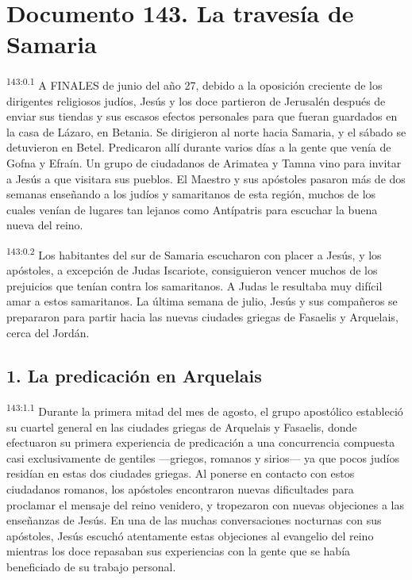 \chapter{Documento 143. La travesía de Samaria}
\par 
\textsuperscript{143:0.1} A FINALES de junio del año 27, debido a la oposición creciente de los dirigentes religiosos judíos, Jesús y los doce partieron de Jerusalén después de enviar sus tiendas y sus escasos efectos personales para que fueran guardados en la casa de Lázaro, en Betania. Se dirigieron al norte hacia Samaria, y el sábado se detuvieron en Betel. Predicaron allí durante varios días a la gente que venía de Gofna y Efraín. Un grupo de ciudadanos de Arimatea y Tamna vino para invitar a Jesús a que visitara sus pueblos. El Maestro y sus apóstoles pasaron más de dos semanas enseñando a los judíos y samaritanos de esta región, muchos de los cuales venían de lugares tan lejanos como Antípatris para escuchar la buena nueva del reino.

\par 
\textsuperscript{143:0.2} Los habitantes del sur de Samaria escucharon con placer a Jesús, y los apóstoles, a excepción de Judas Iscariote, consiguieron vencer muchos de los prejuicios que tenían contra los samaritanos. A Judas le resultaba muy difícil amar a estos samaritanos. La última semana de julio, Jesús y sus compañeros se prepararon para partir hacia las nuevas ciudades griegas de Fasaelis y Arquelais, cerca del Jordán.

\section*{1. La predicación en Arquelais}
\par 
\textsuperscript{143:1.1} Durante la primera mitad del mes de agosto, el grupo apostólico estableció su cuartel general en las ciudades griegas de Arquelais y Fasaelis, donde efectuaron su primera experiencia de predicación a una concurrencia compuesta casi exclusivamente de gentiles ---griegos, romanos y sirios--- ya que pocos judíos residían en estas dos ciudades griegas. Al ponerse en contacto con estos ciudadanos romanos, los apóstoles encontraron nuevas dificultades para proclamar el mensaje del reino venidero, y tropezaron con nuevas objeciones a las enseñanzas de Jesús. En una de las muchas conversaciones nocturnas con sus apóstoles, Jesús escuchó atentamente estas objeciones al evangelio del reino mientras los doce repasaban sus experiencias con la gente que se había beneficiado de su trabajo personal.

